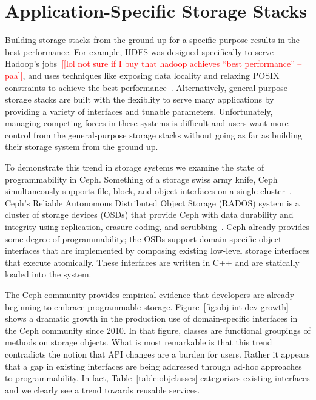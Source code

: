 \documentclass[preprint]{sigplanconf-eurosys}
\newcommand{\paa}[1]{{\textcolor{red}{[[#1 -- paa]]}}}
\begin{document}
\section{Application-Specific Storage Stacks}
\label{sec:application-specifc-storage-stacks}

Building storage stacks from the ground up for a specific purpose results in
the best performance. For example, HDFS was designed specifically to serve
Hadoop's jobs~\paa{lol not sure if I buy that hadoop achieves ``best performance''}, and uses techniques like exposing data locality and relaxing POSIX constraints to achieve
the best performance~\cite{CITEME}. Alternatively, general-purpose storage
stacks are built with the flexiblity to serve many applications by providing a
variety of interfaces and tunable parameters. Unfortunately, managing competing
forces in these systems is difficult and users
want more control from the general-purpose storage stacks
without going as far as building their storage system from the ground up.


To demonstrate this trend in storage systems we examine the state of
programmability in Ceph. Something of a storage swiss army knife, Ceph simultaneously supports file,
block, and object interfaces on a single
cluster~\cite{ceph_contributors_ceph_2010}. Ceph's Reliable Autonomous
Distributed Object Storage (RADOS) system is a cluster of storage devices
(OSDs) that provide Ceph with data durability and integrity using replication,
erasure-coding, and scrubbing~\cite{weil_rados_2007}. Ceph already 
provides some degree of
programmability; the OSDs support domain-specific object interfaces that are
implemented by composing existing low-level storage interfaces that execute
atomically. These interfaces are
written in C++ and are statically loaded into the system.


The Ceph community provides empirical evidence that developers are already beginning to embrace
programmable storage. Figure~\ref{fig:obj-int-dev-growth} shows a dramatic
growth in the production use of domain-specific interfaces in the Ceph
community since 2010. In that figure, classes are functional groupings of methods on storage
objects.  What is most remarkable is that this trend contradicts the notion
that API changes are a burden for users.  Rather it appears that a gap in
existing interfaces are being addressed through ad-hoc approaches to programmability. In fact,
Table~\ref{table:objclasses} categorizes existing interfaces and we clearly see
a trend towards reusable services.
\end{document}
